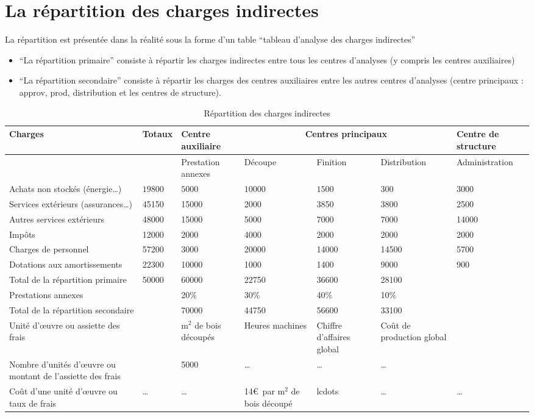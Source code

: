 \documentclass[12pt,a4paper,openany]{report}
\begin{document}
	 \section{La répartition des charges indirectes}
	 La répartition est présentée dans la réalité sous la forme d'un table ``tableau d'analyse des charges indirectes''
	 \begin{itemize}
		 \item ``La répartition primaire'' consiste à répartir les charges indirectes entre tous les centres d'analyses (y compris les centres auxiliaires)
		 \item ``La répartition secondaire'' consiste à répartir les charges des centres auxiliaires entre les autres centres d'analyses (centre principaux : 
			 approv, prod, distribution et les centres de structure).
	 \end{itemize}
	 \begin{table}
		 \begin{center}
	 \begin{tabular}{|p{3.5cm}|p{1.3cm}|p{2.96cm}|p{1.4cm}|p{1.4cm}|p{2.1cm}|p{3.7cm}|}
		 \hline
		 {Charges} & {Totaux} &{ Centre auxiliaire }& \multicolumn{3}{|c|}{{Centres principaux}} & {Centre de structure}\\
		 \hline
		   & &Prestation annexes & Découpe & Finition & Distribution & Administration \\
		 \hline
		 Achats non stockés (énergie\ldots) & $19800$ & $5000$ & $10000$ & $1500$ & $300$ & $3000$\\
		 \hline
		 Services extérieurs (assurances\ldots) & 45150 & 15000 & 2000 & 3850 &3800 &2500\\
		 \hline
		 Autres services extérieurs & 48000 & 15000& 5000& 7000&7000&14000\\
		 \hline
		 Impôts & 12000&2000&4000&2000&2000&2000\\
		 \hline
		 Charges de personnel & 57200&3000&20000&14000&14500&5700\\
		 \hline
		 Dotations aux amortissements & 22300&10000&1000&1400&9000&900\\
		 \hline
		 Total de la répartition primaire & 50000&60000&22750&36600&28100\\
		 \hline
		 Prestations annexes & & 20\% & 30\%& 40\%&10\%\\
		 \hline
		 Total de la répartition secondaire & & 70000&44750&56600&33100\\
		 \hline
		 Unité d'\oe{}uvre ou assiette des frais & & m$^2$ de bois découpés & Heures machines & Chiffre d'affaires global & Coût de production global \\
		 \hline
		 Nombre d'unités d'\oe{}uvre ou montant de l'assiette des frais & & 5000&\ldots&\ldots&\ldots\\
		 \hline
		 Coût d'une unité d'\oe{}uvre ou taux de frais & \ldots&\ldots&14\euro~par m$^2$ de bois découpé&lcdots&\ldots&\ldots\\
		 \hline

	 \end{tabular}
		 \caption{Répartition des charges indirectes}
		 \end{center}
	 \end{table}
	 \newpage
\end{document}

